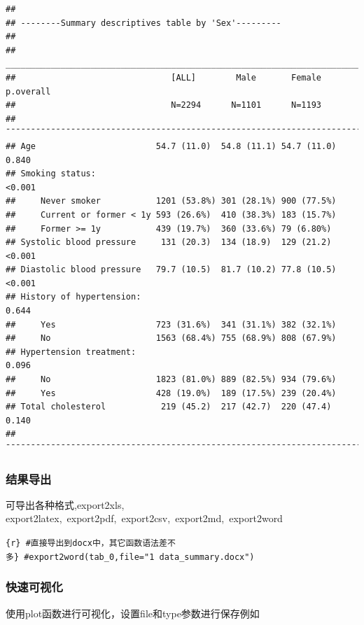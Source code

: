 \documentclass[
]{article}
\begin{document}
\begin{verbatim}
## 
## --------Summary descriptives table by 'Sex'---------
## 
## _________________________________________________________________________ 
##                               [ALL]        Male       Female    p.overall 
##                               N=2294      N=1101      N=1193              
## ¯¯¯¯¯¯¯¯¯¯¯¯¯¯¯¯¯¯¯¯¯¯¯¯¯¯¯¯¯¯¯¯¯¯¯¯¯¯¯¯¯¯¯¯¯¯¯¯¯¯¯¯¯¯¯¯¯¯¯¯¯¯¯¯¯¯¯¯¯¯¯¯¯ 
## Age                        54.7 (11.0)  54.8 (11.1) 54.7 (11.0)   0.840   
## Smoking status:                                                  <0.001   
##     Never smoker           1201 (53.8%) 301 (28.1%) 900 (77.5%)           
##     Current or former < 1y 593 (26.6%)  410 (38.3%) 183 (15.7%)           
##     Former >= 1y           439 (19.7%)  360 (33.6%) 79 (6.80%)            
## Systolic blood pressure     131 (20.3)  134 (18.9)  129 (21.2)   <0.001   
## Diastolic blood pressure   79.7 (10.5)  81.7 (10.2) 77.8 (10.5)  <0.001   
## History of hypertension:                                          0.644   
##     Yes                    723 (31.6%)  341 (31.1%) 382 (32.1%)           
##     No                     1563 (68.4%) 755 (68.9%) 808 (67.9%)           
## Hypertension treatment:                                           0.096   
##     No                     1823 (81.0%) 889 (82.5%) 934 (79.6%)           
##     Yes                    428 (19.0%)  189 (17.5%) 239 (20.4%)           
## Total cholesterol           219 (45.2)  217 (42.7)  220 (47.4)    0.140   
## ¯¯¯¯¯¯¯¯¯¯¯¯¯¯¯¯¯¯¯¯¯¯¯¯¯¯¯¯¯¯¯¯¯¯¯¯¯¯¯¯¯¯¯¯¯¯¯¯¯¯¯¯¯¯¯¯¯¯¯¯¯¯¯¯¯¯¯¯¯¯¯¯¯
\end{verbatim}

\subsubsection{结果导出}\label{ux7ed3ux679cux5bfcux51fa}

可导出各种格式,export2xls, export2latex,~export2pdf,~export2csv,~export2md,~export2word

\texttt{\{r\}\ \#直接导出到docx中，其它函数语法差不多\}\ \#export2word(tab\_0,file="1\ data\_summary.docx")}

\subsubsection{\texorpdfstring{\textbf{快速可视化}}{快速可视化}}\label{ux5febux901fux53efux89c6ux5316}

使用plot函数进行可视化，设置file和type参数进行保存例如
\end{document}

